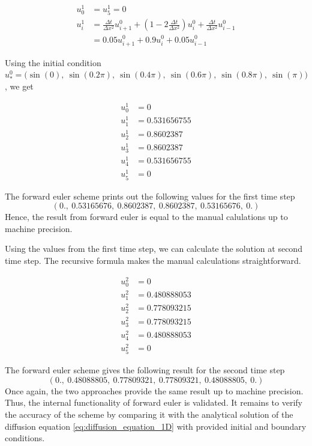 \documentclass[12pt]{extarticle}
\begin{document}
\begin{align*}
	u_0^1 &= u_5^1 = 0 \\
	u_i^1 &= \frac{\Delta t}{\Delta x^2}u_{i+1}^0 + (1 - 2\frac{\Delta t}{\Delta x^2})u_i^0 + \frac{\Delta t}{\Delta x^2}u_{i-1}^0 \\
	&= 0.05u_{i+1}^0 + 0.9u_i^0 + 0.05u_{i-1}^0
\end{align*}

Using the initial condition $u_*^0 = \big(\sin(0),\:\sin(0.2\pi),\:\sin(0.4\pi),\:\sin(0.6\pi), \:\sin(0.8\pi),\:\sin(\pi)\big)$, we get

\begin{align*}
	u_0^1 &= 0 \\
	u_1^1 &= 0.531656755 \\
	u_2^1 &= 0.8602387 \\
	u_3^1 &= 0.8602387 \\
	u_4^1 &= 0.531656755 \\
	u_5^1 &= 0
\end{align*}

The forward euler scheme prints out the following values for the first time step
\[ (0.,\:         0.53165676,\: 0.8602387,\:  0.8602387,\:  0.53165676,\: 0.        ) \]
Hence, the result from forward euler is equal to the manual calulations up to machine precision.

\par Using the values from the first time step, we can calculate the solution at second time step. The recursive formula makes the manual calculations straightforward.

\begin{align*}
	u_0^2 &= 0 \\
	u_1^2 &= 0.480888053 \\
	u_2^2 &= 0.778093215 \\
	u_3^2 &= 0.778093215 \\
	u_4^2 &= 0.480888053 \\
	u_5^2 &= 0
\end{align*}

The forward euler scheme gives the following result for the second time step
\[ (0.,\:         0.48088805,\: 0.77809321,\: 0.77809321,\: 0.48088805,\: 0.        ) \]
Once again, the two approaches provide the same result up to machine precision. Thus, the internal functionality of forward euler is validated. It remains to verify the accuracy of the scheme by comparing it with the analytical solution of the diffusion equation \ref{eq:diffusion_equation_1D} with provided initial and boundary conditions.
\end{document}

